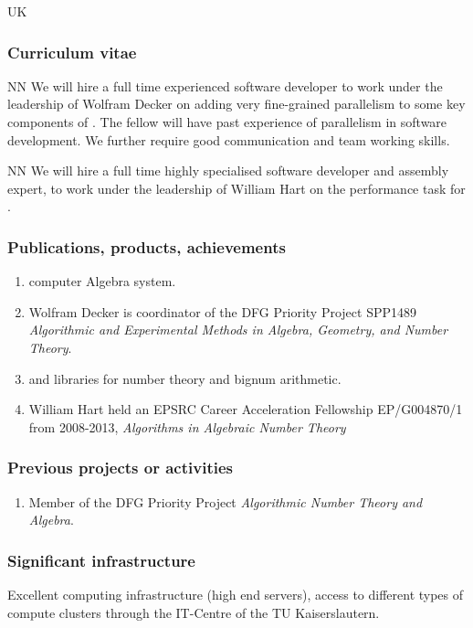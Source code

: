 \begin{sitedescription}{UK}
\subsubsection*{Curriculum vitae}




\begin{participant}[type=res,PM=48]{NN}
We will hire a full time experienced software developer to work
  under the leadership of Wolfram Decker on adding very fine-grained 
  parallelism to some key components of \Singular. The fellow
  will have past experience of parallelism in software development.
  We further require good communication and team working
  skills.
\end{participant}

\begin{participant}[type=res,PM=12]{NN}
  We will hire a full time highly specialised software developer and
  assembly expert, to work under the leadership of William Hart on the
  performance task  for \MPIR.
\end{participant}

\subsubsection*{Publications, products, achievements}

\begin{enumerate}
\item \Singular computer Algebra system.
\item Wolfram Decker is coordinator of the DFG Priority Project SPP1489 \emph{Algorithmic and Experimental Methods in Algebra, Geometry, and
Number Theory}.
\item {} and \MPIR {} libraries for number theory and bignum arithmetic.
\item William Hart held an EPSRC Career Acceleration Fellowship EP/G004870/1 
from 2008-2013, \emph{Algorithms in Algebraic Number Theory}
\end{enumerate}

\subsubsection*{Previous projects or activities}

\begin{enumerate}
\item Member of the DFG Priority Project \emph{Algorithmic Number Theory and Algebra}.
\end{enumerate}

\subsubsection*{Significant infrastructure}

Excellent computing infrastructure (high end servers), access to 
different types of compute clusters through the IT-Centre of the 
TU Kaiserslautern.
\end{sitedescription}







